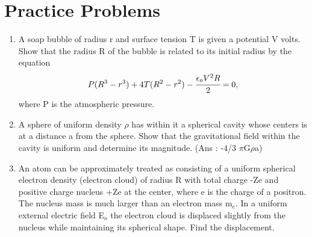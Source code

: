 \section{Practice Problems}
\begin{enumerate}
   \item A soap bubble of radius r and surface tension T is given a potential V volts. Show that the radius R of the bubble is related to its initial radius by the equation
\[ P(R^3 - r^3) + 4T(R^2 - r^2) - \cfrac{\epsilon_oV^2R}{2} = 0,\]
where P is the atmospheric pressure.

\item A sphere of uniform density $\rho$ has within it a spherical cavity whose centers is at a distance a from the sphere. Show that the gravitational field within the cavity is uniform and determine its magnitude. \big(Ans : -4/3 $\pi$G$\rho$a\big)

\item An atom can be approximately treated as consisting of a uniform spherical electron density (electron cloud) of radius R with total charge -Ze and positive charge nucleus +Ze at the center, where e is the charge of a positron. The nucleus mass is much larger than an electron mass m$_e$. In a uniform external electric field E$_o$ the electron cloud is displaced slightly from the nucleus while maintaining its spherical shape. Find the displacement. 


\end{enumerate}
